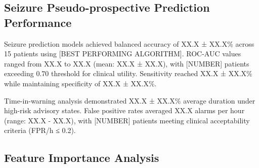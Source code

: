 \subsection{Seizure Pseudo-prospective Prediction Performance}
Seizure prediction models achieved balanced accuracy of XX.X ± XX.X\% across 15 patients using [BEST PERFORMING ALGORITHM]. ROC-AUC values ranged from XX.X to XX.X (mean: XX.X ± XX.X), with [NUMBER] patients exceeding 0.70 threshold for clinical utility. Sensitivity reached XX.X ± XX.X\% while maintaining specificity of XX.X ± XX.X\%.

Time-in-warning analysis demonstrated XX.X ± XX.X\% average duration under high-risk advisory states. False positive rates averaged XX.X alarms per hour (range: XX.X - XX.X), with [NUMBER] patients meeting clinical acceptability criteria (FPR/h ≤ 0.2).

\subsection{Feature Importance Analysis}


\label{sec:results}

